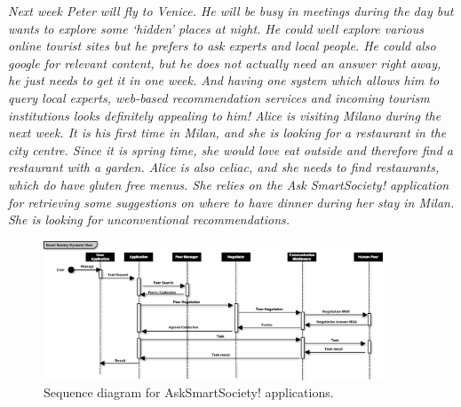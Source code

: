 \textit{Next week Peter will fly to Venice. He will be busy in meetings during the day but wants to explore some ‘hidden’ places at night. He could well explore various online tourist sites but he prefers to ask experts and local people. He could also google for relevant content, but he does not actually need an answer right away, he just needs to get it in one week. And having one system which allows him to query local experts, web-based recommendation services and incoming tourism institutions looks definitely appealing to him!
Alice is visiting Milano during the next week. It is his first time in Milan, and she is looking for a restaurant in the city centre. Since it is spring time, she would love eat outside and therefore  find a restaurant with a garden. Alice is also celiac, and she needs to find restaurants, which do have gluten free menus. She relies on the Ask SmartSociety! application for retrieving some suggestions on where to have dinner during her stay in Milan. She is looking for unconventional recommendations.}


\begin{figure}
\centering
\includegraphics[width=0.9\textwidth]{./figs/sequenceAsk}
\caption{Sequence diagram for AskSmartSociety! applications.}
\label{fig:dynamic_ask}
\end{figure}